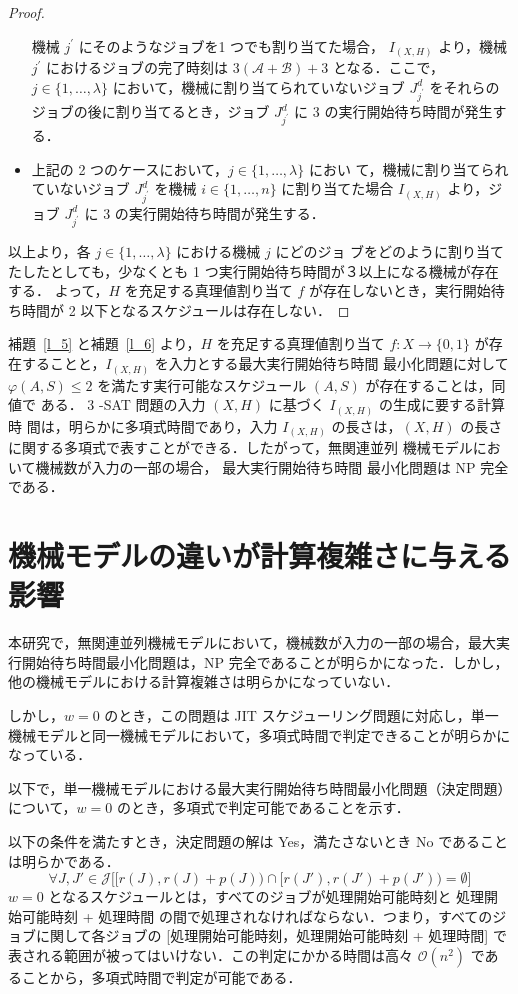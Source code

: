 \documentclass[12pt]{optlab-bachelor}
\begin{document}
\begin{proof}
\begin{itemize}
    機械 $j^{\prime}$ にそのようなジョブを1 つでも割り当てた場合，
    $I_{(X,H)}$ より，機械 $j^{\prime}$ におけるジョブの完了時刻は
    $3(\mathcal{A} + \mathcal{B}) + 3$ となる．ここで，$j \in
    \{1,\ldots,\lambda\}$ において，機械に割り当てられていないジョブ
    $J^d_{j^{\prime}}$ をそれらのジョブの後に割り当てるとき，ジョブ
    $J^d_{j^{\prime}}$ に 3 の実行開始待ち時間が発生する．
    \item 上記の 2 つのケースにおいて，$j \in \{1,\ldots,\lambda\}$ におい
    て，機械に割り当てられていないジョブ $J^d_{j^{\prime}}$ を機械 $i
    \in \{1,\ldots,n\}$ に割り当てた場合 $I_{(X,H)}$ より，ジョブ
    $J^d_{j^{\prime}}$ に 3 の実行開始待ち時間が発生する．
  \end{itemize}
  以上より，各 $j \in \{1,\ldots,\lambda\}$ における機械 $j$ にどのジョ
  ブをどのように割り当てたしたとしても，少なくとも 1 つ実行開始待ち時間が３以上になる機械が存在する．
  よって，$H$ を充足する真理値割り当て $f$ が存在しないとき，実行開始待
  ち時間が 2 以下となるスケジュールは存在しない．
\end{proof}

補題~\ref{l_5} と補題~\ref{l_6} より，$H$ を充足する真理値割り当て $f : X \to \{0,
1\}$ が存在することと，$I_{(X,H)}$ を入力とする最大実行開始待ち時間
最小化問題に対して $\varphi(A, S) \le 2$
を満たす実行可能なスケジュール $(A, S)$ が存在することは，同値で
ある．
3 -SAT 問題の入力 $(X,H)$ に基づく $I_{(X,H)}$ の生成に要する計算時
間は，明らかに多項式時間であり，入力 $I_{(X,H)}$ の長さは，$(X, H)$
の長さに関する多項式で表すことができる．したがって，無関連並列
機械モデルにおいて機械数が入力の一部の場合， 最大実行開始待ち時間
最小化問題は NP 完全である．

\section{機械モデルの違いが計算複雑さに与える影響}
本研究で，無関連並列機械モデルにおいて，機械数が入力の一部の場合，最大実行開始待ち時間最小化問題は，NP 完全であることが明らかになった．しかし，他の機械モデルにおける計算複雑さは明らかになっていない．

しかし，$w = 0$ のとき，この問題は JIT スケジューリング問題に対応し，単一機械モデルと同一機械モデルにおいて，多項式時間で判定できることが明らかになっている．

以下で，単一機械モデルにおける最大実行開始待ち時間最小化問題（決定問題）について，$w = 0$ のとき，多項式で判定可能であることを示す．

以下の条件を満たすとき，決定問題の解は Yes，満たさないとき No であることは明らかである．
$$\forall J,J' \in \mathcal{J}\bigg[\big[r(J),r(J) + p(J)\big) \cap \big[r(J'),r(J') + p(J')\big) = \emptyset\bigg]$$
$w = 0$ となるスケジュールとは，すべてのジョブが処理開始可能時刻と 処理開始可能時刻 + 処理時間 の間で処理されなければならない．つまり，すべてのジョブに関して各ジョブの [処理開始可能時刻，処理開始可能時刻 + 処理時間] で表される範囲が被ってはいけない．この判定にかかる時間は高々 $\mathcal{O}(n^2)$ であることから，多項式時間で判定が可能である．
\end{document}
